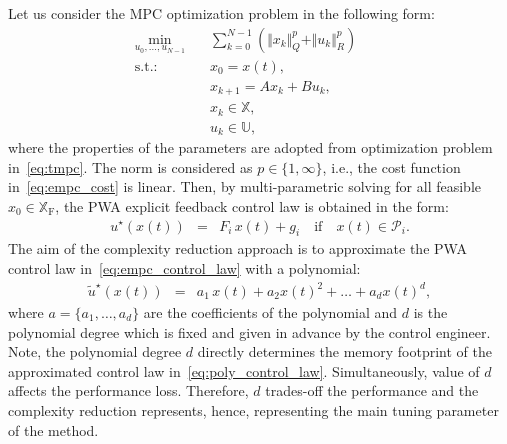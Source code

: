 \documentclass[letterpaper, 10 pt, conference]{ieeeconf}
\begin{document}
Let us consider the MPC optimization problem in the following form:
\begin{subequations}
	\label{eq:empc}
	\begin{eqnarray}
		\label{eq:empc_cost}
		\min_{u_{0},\ldots,u_{N-1}} \!\!\!\!\!\!\!\!\!\!\! &\,& \sum_{k=0}^{N-1} \left( \Vert x_{k} \Vert_{Q}^{p} + \Vert u_{k} \Vert_{R}^{p} \right) \qquad \\
		\label{eq:empc_rpi}
		\mathrm{s.t.\!:} &\,& x_0 = x(t), \\
		\label{eq:empc_model}
		&\,&  x_{k+1} = A x_{k} + B u_{k} , \\
		\label{eq:empc_constraints_state}
		&\,& x_{k} \in \mathbb{X} , \\
		\label{eq:empc_constraints_input}
		&\,& u_{k} \in \mathbb{U},
	\end{eqnarray}
\end{subequations}
where the properties of the parameters are adopted from optimization problem in~\eqref{eq:tmpc}. The norm is considered as $p \in \{1,\infty \}$, i.e., the cost function in~\eqref{eq:empc_cost} is linear. Then, by multi-parametric solving for all feasible $x_0 \in \mathbb{X}_{\mathrm{F}}$, the PWA explicit feedback control law is obtained in the form:
\begin{eqnarray}
	\label{eq:empc_control_law}
	u^{\star}(x(t)) \!\!\!\!&=&\!\!\!\! F_{i} \, x(t) + g_{i} \quad \text{if} \quad x(t) \in \mathcal{P}_{i}.
\end{eqnarray}
The aim of the complexity reduction approach is to approximate the PWA control law in~\eqref{eq:empc_control_law} with a polynomial:
\begin{eqnarray}
	\label{eq:poly_control_law}
	\widetilde{u}^{\star}(x(t)) \!\!\!\!&=&\!\!\!\! a_{1} \, x(t) + a_{2} x(t)^2 + \dots + a_{d} x(t)^d,
\end{eqnarray}
where $a =\{a_{1}, \dots, a_{d}\}$ are the coefficients of the polynomial and $d$ is the polynomial degree which is fixed and given in advance by the control engineer. Note, the polynomial degree $d$ directly determines the memory footprint of the approximated control law in~\eqref{eq:poly_control_law}. Simultaneously, value of $d$ affects the performance loss. Therefore, $d$ trades-off the performance and the complexity reduction represents, hence, representing the main tuning parameter of the method.
\end{document}
